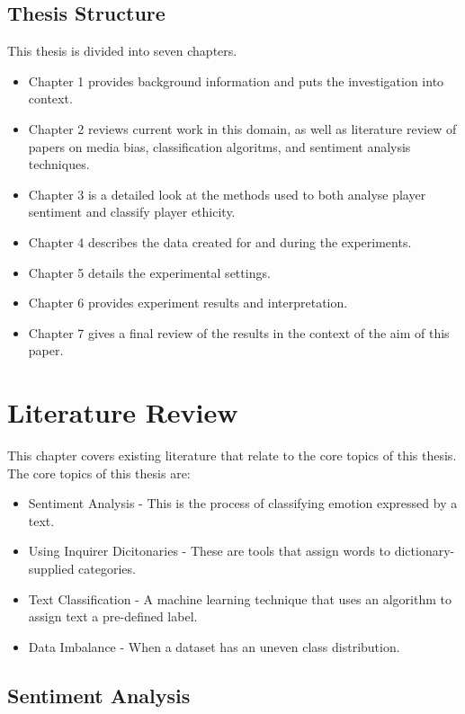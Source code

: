 \documentclass[oneside,12pt]{Classes/RoboticsLaTeX}
\begin{document}
\section{Thesis Structure}
This thesis is divided into seven chapters.
\begin{itemize}
  \item Chapter 1 provides background information and puts the investigation into context.
  \item Chapter 2 reviews current work in this domain, as well as literature review of papers on media bias, classification algoritms, and sentiment analysis techniques.
  \item Chapter 3 is a detailed look at the methods used to both analyse player sentiment and classify player ethicity.
  \item Chapter 4 describes the data created for and during the experiments.
  \item Chapter 5 details the experimental settings.
  \item Chapter 6 provides experiment results and interpretation.
  \item Chapter 7 gives a final review of the results in the context of the aim of this paper.
\end{itemize}


\chapter{Literature Review}
\label{chap:lit_review}
This chapter covers existing literature that relate to the core topics of this thesis. The core topics of this thesis are:
\begin{itemize}
  \item Sentiment Analysis - This is the process of classifying emotion expressed by a text.
  \item Using Inquirer Dicitonaries - These are tools that assign words to dictionary-supplied categories.
  \item Text Classification - A machine learning technique that uses an algorithm to assign text a pre-defined label.
  \item Data Imbalance - When a dataset has an uneven class distribution.
\end{itemize} \par

\section{Sentiment Analysis}
\end{document}
